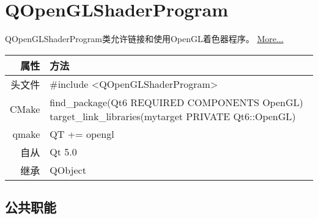\chapter{QOpenGLShaderProgram}


QOpenGLShaderProgram类允许链接和使用OpenGL着色器程序。 \href{https://doc.qt.io/qt-6/qopenglshaderprogram.html#details}{More...} 

\begin{tabular}{|r|m{35em}|}
	\hline
	属性 & 方法 \\
	\hline
	头文件 & \#include <QOpenGLShaderProgram>\\ 
    \hline     
	CMake & find\_package(Qt6 REQUIRED COMPONENTS OpenGL) target\_link\_libraries(mytarget PRIVATE Qt6::OpenGL)\\ 
	\hline
	qmake & QT += opengl\\   
    \hline   
	自从 & Qt 5.0\\  
    \hline 
	继承 &	QObject\\   
	\hline
\end{tabular}


\section{公共职能}


